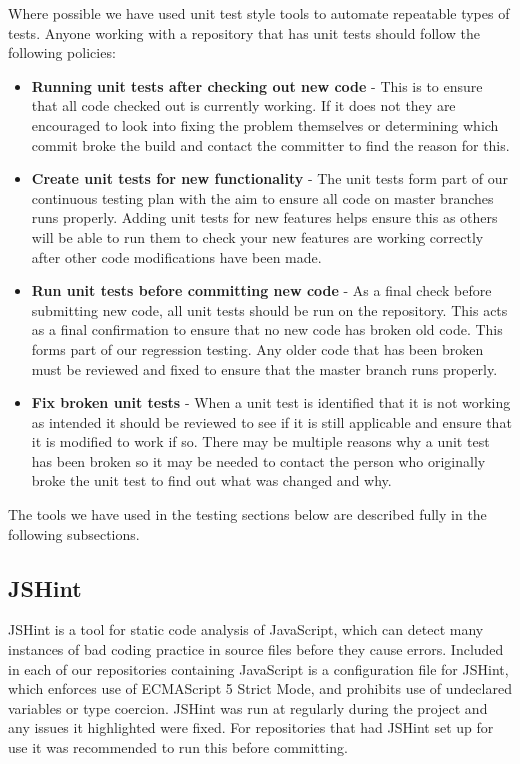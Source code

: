 Where possible we have used unit test style tools to automate repeatable types of tests. Anyone working with a repository that has unit tests should follow the following policies:

\begin{itemize}
\item \textbf{Running unit tests after checking out new code} - This is to ensure that all code checked out is currently working. If it does not they are encouraged to look into fixing the problem themselves or determining which commit broke the build and contact the committer to find the reason for this.

\item \textbf{Create unit tests for new functionality} - The unit tests form part of our continuous testing plan with the aim to ensure all code on master branches runs properly. Adding unit tests for new features helps ensure this as others will be able to run them to check your new features are working correctly after other code modifications have been made.

\item \textbf{Run unit tests before committing new code} - As a final check before submitting new code, all unit tests should be run on the repository. This acts as a final confirmation to ensure that no new code has broken old code. This forms part of our regression testing. Any older code that has been broken must be reviewed and fixed to ensure that the master branch runs properly.

\item \textbf{Fix broken unit tests} - When a unit test is identified that it is not working as intended it should be reviewed to see if it is still applicable and ensure that it is modified to work if so. There may be multiple reasons why a unit test has been broken so it may be needed to contact the person who originally broke the unit test to find out what was changed and why.
\end{itemize}

The tools we have used in the testing sections below are described fully in the following subsections.

\subsection{JSHint}

JSHint is a tool for static code analysis of JavaScript, which can detect many instances of bad coding practice in source files before they cause errors. Included in each of our repositories containing JavaScript is a configuration file for JSHint, which enforces use of ECMAScript 5 Strict Mode, and prohibits use of undeclared variables or type coercion. JSHint was run at regularly during the project and any issues it highlighted were fixed. For repositories that had JSHint set up for use it was recommended to run this before committing.

